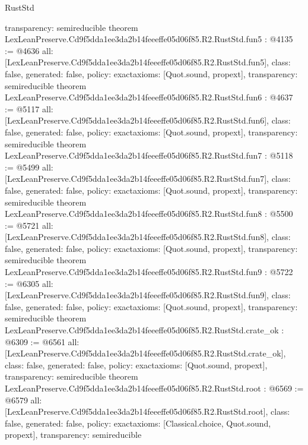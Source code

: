 \begin{lexlean}{RustStd}
\begin{coremodule}
{  transparency: semireducible
}
theorem LexLeanPreserve.Cd9f5dda1ee3da2b14feeeffe05d06f85.R2.RustStd.fun5 : @4135 := @4636 {
  all: [LexLeanPreserve.Cd9f5dda1ee3da2b14feeeffe05d06f85.R2.RustStd.fun5],
  class: false,
  generated: false,
  policy: exact{axioms: [Quot.sound, propext]},
  transparency: semireducible
}
theorem LexLeanPreserve.Cd9f5dda1ee3da2b14feeeffe05d06f85.R2.RustStd.fun6 : @4637 := @5117 {
  all: [LexLeanPreserve.Cd9f5dda1ee3da2b14feeeffe05d06f85.R2.RustStd.fun6],
  class: false,
  generated: false,
  policy: exact{axioms: [Quot.sound, propext]},
  transparency: semireducible
}
theorem LexLeanPreserve.Cd9f5dda1ee3da2b14feeeffe05d06f85.R2.RustStd.fun7 : @5118 := @5499 {
  all: [LexLeanPreserve.Cd9f5dda1ee3da2b14feeeffe05d06f85.R2.RustStd.fun7],
  class: false,
  generated: false,
  policy: exact{axioms: [Quot.sound, propext]},
  transparency: semireducible
}
theorem LexLeanPreserve.Cd9f5dda1ee3da2b14feeeffe05d06f85.R2.RustStd.fun8 : @5500 := @5721 {
  all: [LexLeanPreserve.Cd9f5dda1ee3da2b14feeeffe05d06f85.R2.RustStd.fun8],
  class: false,
  generated: false,
  policy: exact{axioms: [Quot.sound, propext]},
  transparency: semireducible
}
theorem LexLeanPreserve.Cd9f5dda1ee3da2b14feeeffe05d06f85.R2.RustStd.fun9 : @5722 := @6305 {
  all: [LexLeanPreserve.Cd9f5dda1ee3da2b14feeeffe05d06f85.R2.RustStd.fun9],
  class: false,
  generated: false,
  policy: exact{axioms: [Quot.sound, propext]},
  transparency: semireducible
}
theorem LexLeanPreserve.Cd9f5dda1ee3da2b14feeeffe05d06f85.R2.RustStd.crate_ok : @6309 := @6561 {
  all: [LexLeanPreserve.Cd9f5dda1ee3da2b14feeeffe05d06f85.R2.RustStd.crate_ok],
  class: false,
  generated: false,
  policy: exact{axioms: [Quot.sound, propext]},
  transparency: semireducible
}
theorem LexLeanPreserve.Cd9f5dda1ee3da2b14feeeffe05d06f85.R2.RustStd.root : @6569 := @6579 {
  all: [LexLeanPreserve.Cd9f5dda1ee3da2b14feeeffe05d06f85.R2.RustStd.root],
  class: false,
  generated: false,
  policy: exact{axioms: [Classical.choice, Quot.sound, propext]},
  transparency: semireducible
}


\end{coremodule}
\end{lexlean}

